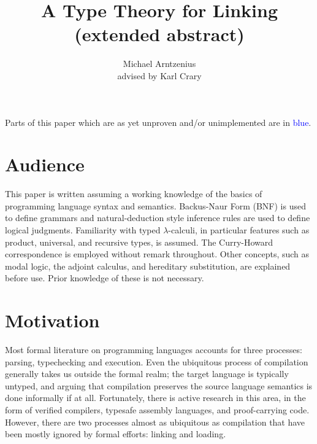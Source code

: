 \documentclass[11pt]{article}
\title{A Type Theory for Linking\\{\large (extended abstract)}}
\author{Michael Arntzenius\\advised by Karl Crary}
\newcommand{\bscolor}{blue}
\newcommand{\bs}[1]{\textcolor{\bscolor}{#1}}
\begin{document}
\maketitle

{\small Parts of this paper which are as yet unproven and/or unimplemented
  are in \bs{\bscolor}.}


\section{Audience}

This paper is written assuming a working knowledge of the basics of programming
language syntax and semantics. Backus-Naur Form (BNF) is used to define grammars
and natural-deduction style inference rules are used to define logical
judgments. Familiarity with typed $\lambda$-calculi, in particular features such
as product, universal, and recursive types, is assumed. The Curry-Howard
correspondence is employed without remark throughout. Other concepts, such as
modal logic, the adjoint calculus, and hereditary substitution, are explained
before use. Prior knowledge of these is not necessary.





\section{Motivation}

Most formal literature on programming languages accounts for three processes:
parsing, typechecking and execution. Even the ubiquitous process of compilation
generally takes us outside the formal realm; the target language is typically
untyped, and arguing that compilation preserves the source language semantics is
done informally if at all. Fortunately, there is active research in this area,
in the form of verified compilers, typesafe assembly languages, and
proof-carrying code. However, there are two processes almost as ubiquitous as
compilation that have been mostly ignored by formal efforts: linking and
loading.
\end{document}
